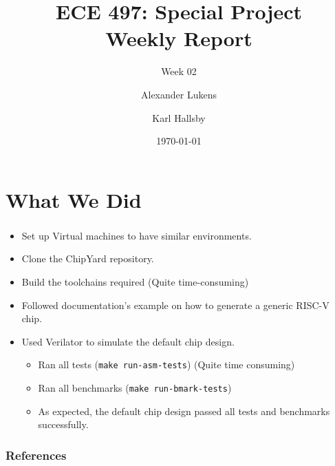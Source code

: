 \documentclass{../weeklyslides}
\title[Weekly Report]{ECE 497: Special Project \\ Weekly Report}
\subtitle{Week 02}
\author{Alexander Lukens \and Karl Hallsby}
\institute{Illinois Institute of Technology}
\date{\today}
\begin{document}
\nocite{chipyard}

\begin{frame}
  \titlepage{}
\end{frame}

\section{What We Did}\label{sec:What_We_Did}
\begin{frame}
  \frametitle{}
  \begin{itemize}
  \item Set up Virtual machines to have similar environments.
  \item Clone the ChipYard repository.
  \item Build the toolchains required (Quite time-consuming)
  \item Followed documentation's example on how to generate a generic RISC-V chip.
  \item Used Verilator to simulate the default chip design.
    \begin{itemize}
    \item Ran all tests (\texttt{make run-asm-tests}) (Quite time consuming)
    \item Ran all benchmarks (\texttt{make run-bmark-tests})
    \item As expected, the default chip design passed all tests and benchmarks successfully.
    \end{itemize}
  \end{itemize}
\end{frame}

\begin{frame}
  \frametitle{References}
  \printbibliography[heading=bibintoc]{}
\end{frame}
\end{document}
